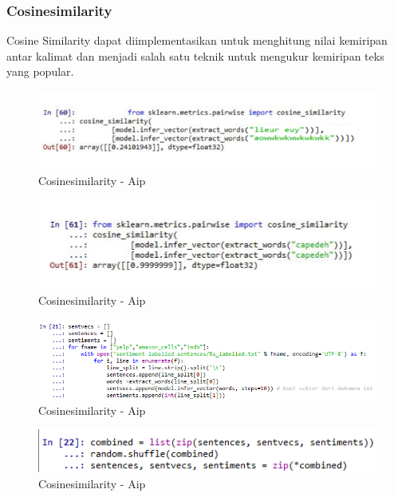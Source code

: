 \subsubsection{Cosinesimilarity}
Cosine Similarity dapat diimplementasikan untuk menghitung nilai kemiripan antar kalimat dan menjadi salah satu teknik untuk mengukur kemiripan  teks yang  popular. 
\begin{figure}[ht]
\centering
\includegraphics[scale=0.3]{figures/AIP/e27.PNG}
\caption{Cosinesimilarity - Aip}
\label{Cosinesimilarity - Aip}
\end{figure}

\begin{figure}[ht]
\centering
\includegraphics[scale=0.3]{figures/AIP/e28.PNG}
\caption{Cosinesimilarity - Aip}
\label{Cosinesimilarity - Aip}
\end{figure}

\begin{figure}[ht]
\centering
\includegraphics[scale=0.3]{figures/AIP/e29.PNG}
\caption{Cosinesimilarity - Aip}
\label{Cosinesimilarity - Aip}
\end{figure}

\begin{figure}[ht]
\centering
\includegraphics[scale=0.3]{figures/AIP/e30.PNG}
\caption{Cosinesimilarity - Aip}
\label{Cosinesimilarity - Aip}
\end{figure}

